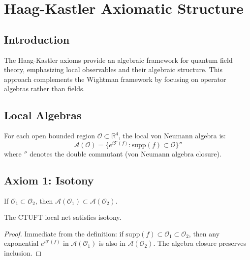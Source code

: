 \section{Haag-Kastler Axiomatic Structure}
\label{sec:haag_kastler}

\subsection{Introduction}

The Haag-Kastler axioms \cite{haag1964} provide an algebraic framework for quantum field theory, emphasizing local observables and their algebraic structure. This approach complements the Wightman framework by focusing on operator algebras rather than fields.

\subsection{Local Algebras}

\begin{definition}
For each open bounded region $\mathcal{O} \subset \mathbb{R}^4$, the local von Neumann algebra is:
\begin{equation}
    \mathcal{A}(\mathcal{O}) = \{ e^{i\mathcal{T}(f)} : \text{supp}(f) \subset \mathcal{O} \}''
\end{equation}
where $''$ denotes the double commutant (von Neumann algebra closure).
\end{definition}

\subsection{Axiom 1: Isotony}

\begin{axiom}[Isotony]
If $\mathcal{O}_1 \subset \mathcal{O}_2$, then $\mathcal{A}(\mathcal{O}_1) \subset \mathcal{A}(\mathcal{O}_2)$.
\end{axiom}

\begin{theorem}
The CTUFT local net satisfies isotony.
\end{theorem}

\begin{proof}
Immediate from the definition: if $\text{supp}(f) \subset \mathcal{O}_1 \subset \mathcal{O}_2$, then any exponential $e^{i\mathcal{T}(f)}$ in $\mathcal{A}(\mathcal{O}_1)$ is also in $\mathcal{A}(\mathcal{O}_2)$. The algebra closure preserves inclusion.
\end{proof}

